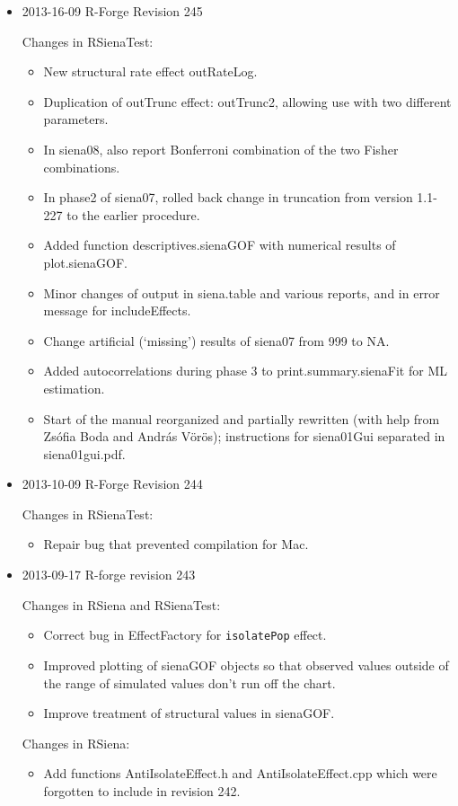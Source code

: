 \documentclass[a4paper,fleqn,11pt]{article}
\newcommand{\+}{\, + \,}
\newcommand{\sfn}[1]{\textsf{#1}}
\begin{document}
\begin{small}
\begin{itemize}
\item 2013-16-09 R-Forge Revision 245

Changes in \textsf{RSienaTest}:
\begin{itemize}
   \item New structural rate effect \sfn{outRateLog}.
   \item Duplication of \sfn{outTrunc} effect: \sfn{outTrunc2}, allowing use
    with two different parameters.
   \item In \sfn{siena08}, also report Bonferroni combination
     of the two Fisher combinations.
   \item In phase2 of \sfn{siena07}, rolled back change in truncation
     from version 1.1-227 to the earlier procedure.
   \item Added function \sfn{descriptives.sienaGOF} with numerical results
   of \sfn{plot.sienaGOF}.
   \item Minor changes of output in \sfn{siena.table} and various reports,
    and in error message for \sfn{includeEffects}.
   \item  Change artificial (`missing') results of \sfn{siena07} from 999
    to NA.
   \item Added autocorrelations during phase 3 to \sfn{print.summary.sienaFit}
   for ML estimation.
   \item Start of the manual reorganized and partially rewritten (with help from
     Zs\'{o}fia Boda and Andr\'{a}s V\"{o}r\"{o}s); instructions for
     \sfn{siena01Gui} separated in siena01gui.pdf.
  \end{itemize}

\item 2013-10-09 R-Forge Revision 244

Changes in \textsf{RSienaTest}:

\begin{itemize}
\item Repair bug that prevented compilation for Mac.
\end{itemize}

\item 2013-09-17 R-forge revision 243

Changes in \textsf{RSiena} and \textsf{RSienaTest}:
  \begin{itemize}
   \item Correct bug in \sfn{EffectFactory} for \texttt{isolatePop} effect.
   \item Improved plotting of \textsf{sienaGOF} objects so that observed values
     outside of the range of simulated values don't run off the chart.
   \item Improve treatment of structural values in \textsf{sienaGOF}.
  \end{itemize}
Changes in RSiena:
  \begin{itemize}
   \item Add functions \sfn{AntiIsolateEffect.h} and \sfn{AntiIsolateEffect.cpp}
     which were forgotten to include in revision 242.
  \end{itemize}


\end{itemize}
\end{small}
\end{document}
